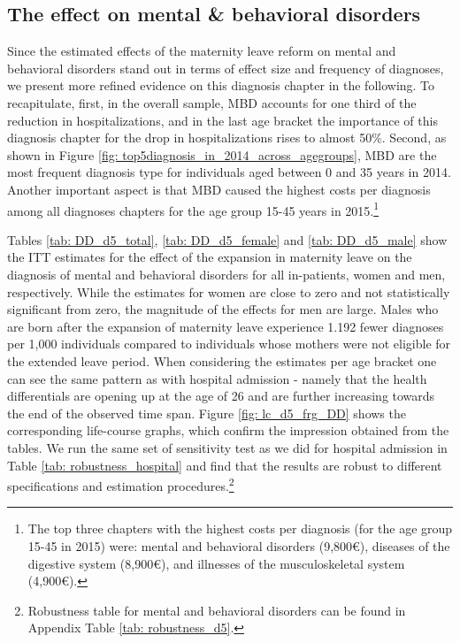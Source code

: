 \documentclass[11pt, a4paper]{article} %
\begin{document}
\subsection{The effect on mental \& behavioral disorders}
Since the estimated effects of the maternity leave reform on mental and behavioral disorders stand out in terms of effect size and frequency of diagnoses, we present more refined evidence on this diagnosis chapter in the following. To recapitulate, first, in the overall sample, MBD accounts for one third of the reduction in hospitalizations, and in the last age bracket the importance of this diagnosis chapter for the drop in hospitalizations rises to almost 50\%. Second, as shown in Figure \ref{fig: top5diagnosis_in_2014_across_agegroups}, MBD are the most frequent diagnosis type for individuals aged between 0 and 35 years in 2014. Another important aspect is that MBD caused the highest costs per diagnosis among all diagnoses chapters for the age group 15-45 years in 2015.\footnote{The top three chapters with the highest costs per diagnosis (for the age group 15-45 in 2015) were: mental and behavioral disorders (9,800{\euro}), diseases of the digestive system (8,900{\euro}), and illnesses of the musculoskeletal system (4,900{\euro}).} \newline

Tables \ref{tab: DD_d5_total}, \ref{tab: DD_d5_female} and \ref{tab: DD_d5_male} show the ITT estimates for the effect of the expansion in maternity leave on the diagnosis of mental and behavioral disorders for all in-patients, women and men, respectively. While the estimates for women are close to zero and not statistically significant from zero, the magnitude of the effects for men are large. Males who are born after the expansion of maternity leave experience 1.192 fewer diagnoses per 1,000 individuals compared to individuals whose mothers were not eligible for the extended leave period. When considering the estimates per age bracket one can see the same pattern as with hospital admission - namely that the health differentials are opening up at the age of 26 and are further increasing towards the end of the observed time span. Figure \ref{fig: lc_d5_frg_DD} shows the corresponding life-course graphs, which confirm the impression obtained from the tables. We run the same set of sensitivity test as we did for hospital admission in Table \ref{tab: robustness_hospital} and find that the results are robust to different specifications and estimation procedures.\footnote{Robustness table for mental and behavioral disorders can be found in Appendix Table \ref{tab: robustness_d5}.} \newline
\end{document}
